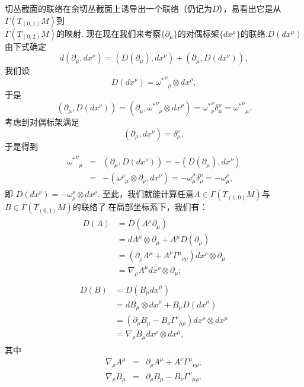 		切丛截面的联络在余切丛截面上诱导出一个联络（仍记为$D$），易看出它是从$\varGamma(T_{(0,1)}M)$到\\$\varGamma(T_{(0,2)}M)$的映射.
		现在现在我们来考察$\{\partial_\mu\}$的对偶标架$\{dx^\mu\}$的联络.$D(dx^\mu)$由下式确定
		$$d\left(\partial_\mu,dx^\nu\right)=\left(D(\partial_\mu),dx^\nu\right)+\left(\partial_\mu,D(dx^\nu)\right),$$
		我们设
		$$D(dx^\nu)={{\omega^*}^\nu}_\rho\otimes{dx}^\rho,$$
		于是
		$$\left(\partial_\mu,D(dx^\nu)\right)=\left(\partial_\mu,{{\omega^*}^\nu}_\rho\otimes{dx}^\rho\right)={\omega^*}^\nu_\rho\delta^\rho_\mu={{\omega^*}^\nu}_\mu.$$
		考虑到对偶标架满足
		$$\left(\partial_\mu,dx^\nu\right)=\delta^\nu_\mu,$$ 
		于是得到
		\begin{eqnarray}
			\begin{split}
				{{\omega^*}^\nu}_\mu&=&\left(\partial_\mu,D(dx^\nu)\right)=-\left(D(\partial_\mu),dx^\nu\right)\\
				&=&-\left({\omega^\rho}_\mu\otimes\partial_\rho,dx^\nu\right)=-{\omega}^\rho_\mu\delta^\nu_\rho=-{\omega}^\nu_\mu,
			\end{split}
		\end{eqnarray}
		即
		$D(dx^\nu)=-{\omega}^\nu_\rho\otimes{dx}^\rho$.
		至此，我们就能计算任意$A\in \varGamma(T_{(1,0)}M)$与$B\in \varGamma(T_{(0,1)}M)$的联络了.在局部坐标系下，我们有：			
		\begin{eqnarray}
			\begin{split}
				D(A)&=D(A^\mu\partial_\mu)\\
				&=dA^\mu\otimes\partial_\mu+A^{\mu}D(\partial_\mu)\\
				&=(\partial_{\rho}A^\mu+A^{\nu}{\varGamma^\mu}_{\nu\rho})dx^\rho{\otimes}\partial_\mu\\
				&=\nabla_{\rho}A^{\mu}dx^\rho{\otimes}\partial_\mu;
			\end{split}
		\end{eqnarray}
		\begin{eqnarray}
			\begin{split}
				D(B)&=D(B_{\mu}{dx}^\mu)\\
				&=dB_\mu\otimes{dx}^\mu+B_{\mu}D({dx}^\mu)\\
				&=(\partial_{\rho}B_\mu-B_\nu{\varGamma^\nu}_{\mu\rho})dx^\rho{\otimes}dx^\mu\\
				&=\nabla_{\rho}B_{\mu}dx^\rho{\otimes}dx^\mu,
			\end{split}
		\end{eqnarray}
		其中
		\begin{eqnarray}
			\nabla_{\rho}A^\mu&=&\partial_{\rho}A^\mu+A^{\nu}{\varGamma^\mu}_{\nu\rho};\\
				\nabla_{\rho}B_{\mu}&=&\partial_{\rho}B_\mu-B_\nu{\varGamma^\nu}_{\mu\rho}.
		\end{eqnarray}							
